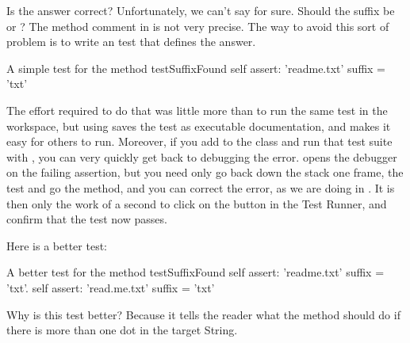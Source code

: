 \documentclass[a4paper,10pt,twoside]{book}
\begin{document}

Is the answer correct?  Unfortunately, we can't say for sure.  Should the suffix be  or ?
The method comment in  is not very precise.  
The way to avoid this sort of problem is to write an  test that defines the answer.

\begin{method}[testSuffix]{A simple test for the  method}
testSuffixFound
	self assert: 'readme.txt' suffix = 'txt'
\end{method}

The effort required to do that was little more than to run the same test in the workspace, but using \sunit saves the test as executable documentation, and makes it easy for others to run.
Moreover, if you add  to the class  and run that test suite with \sunit, you can very quickly get back to debugging the error.
\sunit opens the debugger on the failing assertion, but you need only go back down the stack one frame,  the test and go  the  method, and you can correct the error, as we are doing in .
It is then only the work of a second to click on the  button in the \sunit Test Runner, and confirm that the test now passes.

Here is a better test:

\begin{method}[testSuffix2]{A better test for the  method}
testSuffixFound
	self assert: 'readme.txt' suffix = 'txt'.
	self assert: 'read.me.txt' suffix = 'txt'
\end{method}
\noindent
Why is this test better?  Because it tells the reader what the method should do if there is more than one dot in the target String.
\end{document}
